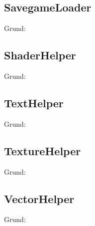 \subsection{SavegameLoader}
Grund:
\subsection{ShaderHelper}
Grund:
\subsection{TextHelper}
Grund:
\subsection{TextureHelper}
Grund:
\subsection{VectorHelper}
Grund:



